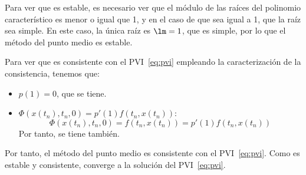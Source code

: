 \begin{ejercicio}
    Para ver que es estable, es necesario ver que el módulo de las raíces del polinomio característico es menor o igual que 1, y en el caso de que sea igual a 1, que la raíz sea simple. En este caso, la única raíz es $\lm = 1$, que es simple, por lo que el método del punto medio es estable.

    Para ver que es consistente con el PVI~\eqref{eq:pvi} empleando la caracterización de la consistencia, tenemos que:
    \begin{itemize}
        \item $p(1)= 0$, que se tiene.
        \item $\Phi(x(t_n), t_n, 0)=p'(1)f(t_n, x(t_n))$:
        \begin{equation*}
            \Phi(x(t_n), t_n, 0) = f\left(t_n, x(t_n)\right) = p'(1) f(t_n, x(t_n))
        \end{equation*}
        Por tanto, se tiene también.
    \end{itemize}
    
    Por tanto, el método del punto medio es consistente con el PVI~\eqref{eq:pvi}. Como es estable y consistente, converge a la solución del PVI~\eqref{eq:pvi}.
\end{ejercicio}

